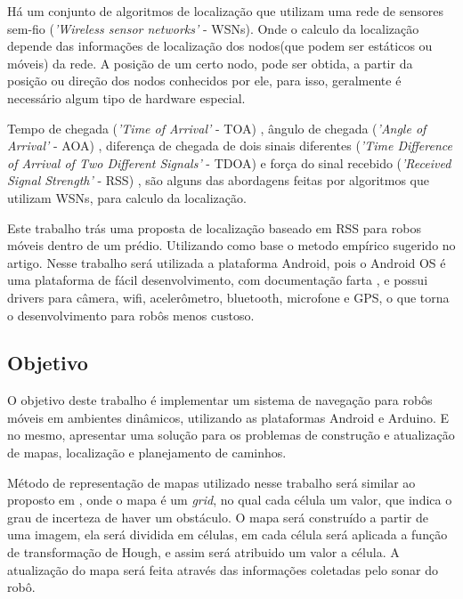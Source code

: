\documentclass[12pt]{article}
\begin{document}
	Há um conjunto de algoritmos de localização que utilizam uma rede de sensores sem-fio (\textit{'Wireless sensor networks'} - WSNs). Onde o 
	calculo da localização depende das informações de localização dos nodos(que podem ser estáticos ou móveis) da rede\cite{omc}.
	A posição de um certo nodo, pode ser obtida, a partir da posição ou direção dos nodos conhecidos por ele, para isso, geralmente 
	é necessário algum tipo de hardware especial. 
	
	Tempo de chegada (\textit{'Time of Arrival'} - TOA) \cite{gps}, ângulo de chegada (\textit{'Angle of Arrival'} - AOA) \cite{aoa}, 
	diferença de chegada de dois sinais diferentes (\textit{'Time Difference of Arrival of Two Different Signals'} - TDOA) \cite{tdoa} 
	e força do sinal recebido (\textit{'Received Signal Strength'} - RSS) \cite{wifiRadar}, são alguns das abordagens feitas por algoritmos que utilizam WSNs,
	para calculo da localização.
	
	Este trabalho trás uma proposta de localização baseado em RSS para robos móveis dentro de um prédio. Utilizando como base o metodo empírico sugerido no artigo\cite{wifiRadar}. Nesse trabalho
	será utilizada a plataforma Android, pois o Android OS \cite{androidSite} é uma plataforma de fácil desenvolvimento, com documentação farta \cite{androidDev}, e possui drivers para câmera, wifi, acelerômetro, 
	bluetooth, microfone e GPS, o que torna o desenvolvimento para robôs menos custoso\cite{androidRobot}. 
  
 
 \subsection{Objetivo}
    
    O objetivo deste trabalho é implementar um sistema de navegação para robôs móveis em ambientes dinâmicos, utilizando as plataformas Android e Arduino. 
    E no mesmo, apresentar uma solução para os problemas de construção e atualização de mapas, localização e planejamento de caminhos.
    
    Método de representação de mapas utilizado nesse trabalho será similar ao proposto em \cite{cnn}, onde o mapa é um \textit{grid},
    no qual cada célula um valor, que indica o grau de incerteza de haver um obstáculo. O mapa será construído a partir de uma imagem, ela
    será dividida em células, em cada célula será aplicada a função de transformação de Hough\cite{openCV}, e assim será atribuido um valor a célula. A atualização do 
    mapa será feita através das informações coletadas pelo sonar do robô.
    
\end{document}
